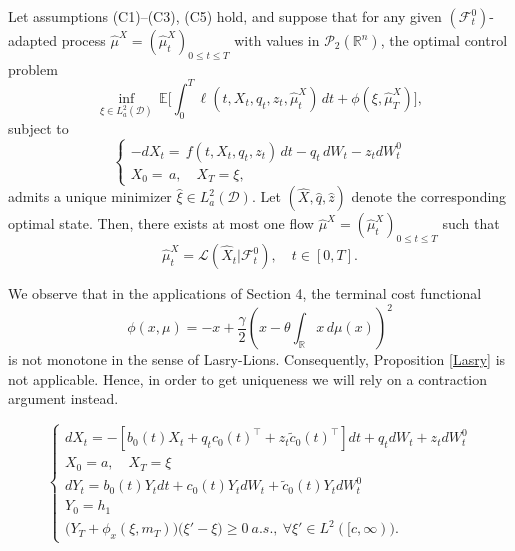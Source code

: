 \documentclass[10pt,a4paper]{amsart}
\begin{document}
\begin{prop}
\label{Lasry}
 Let assumptions \textnormal{(C1)--(C3), (C5)} hold,  and  suppose that for any given $(\mathcal{F}_t^0)$-adapted process $\hat \mu^X =(\hat \mu^X _t)_{0\leq t\leq T}$ with values in  $\mathcal{P}_2(\mathbb{R}^n) $, the optimal control problem 
 \begin{equation} \label{eq:opt_problem}
\inf_{\xi \in L^2_a(\mathcal{D})} \, \mathbb{E} \Bigg[  \int_0^T \ell(t, X_t, q_t, z_t ,  \hat \mu_t^X) \, dt + \phi(\xi, \hat \mu^X_T) \Bigg],
\end{equation}
subject to
\begin{equation}
\begin{cases}
    -dX_t =  \, f(t, X_t, q_t, z_t) \, dt - q_t \, dW_t-z_tdW_t^0\\  
X_0 =  \, a, \quad X_T = \xi,
\end{cases}
\end{equation}
admits a unique minimizer \( \hat \xi\in L^2_a(\mathcal{D})\). Let $( \hat X, \hat q, \hat z )$ denote the corresponding optimal state. Then, there exists at most one flow $\hat \mu^X=(\hat \mu_t^X)_{0\leq t\leq T}$ such that
\begin{equation}
\label{cons}
  \hat \mu_t^X=\mathcal{L}(\hat X_t|\mathcal{F}_t^0), \quad t \in [0, T]. 
\end{equation}
\end{prop}

\begin{rem}\label{Lasry-appl} 
We observe that in the applications of Section 4, the terminal cost functional
\[
\phi(x,\mu) = -x + \frac{\gamma}{2}\left(x - \theta \int_{\mathbb R}x\,d\mu(x)\right)^2
\]
is not monotone in the sense of Lasry-Lions. Consequently, Proposition \ref{Lasry} is not applicable. Hence, in order to get uniqueness we will rely on a contraction argument instead.
\end{rem}

\begin{equation}
\label{FBSDE_Cont CN l}
    \begin{cases}
    dX_t=-[b_0(t)X_t+q_tc_0(t)^\top +z_t\tilde{c}_0(t)^\top]dt +q_tdW_t+z_tdW_t^0\\
      X_0 =a, \quad X_T=\xi\\
  
    dY_t=b_0(t)Y_tdt+c_0(t)Y_tdW_t
    +\tilde{c}_0(t)Y_tdW_t^0\\
   Y_0=h_1\\

    \big( Y_T+ \phi_x(\xi, m_T)\big)\big( \xi'-\xi \big) \geq 0 \ a.s., \ \forall \xi' \in L^2([c, \infty)).        
   \end{cases}
\end{equation}
\end{document}
